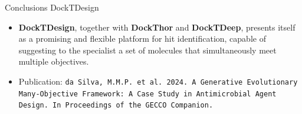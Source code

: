 \documentclass[aspectratio=169,xcolor=dvipsnames]{beamer}
\begin{document}
\begin{frame}{Conclusions \hfill {\footnotesize \alert{DockTDesign}}}

    \begin{itemize}




        \item \textbf{DockTDesign}, together with \textbf{DockThor} and \textbf{DockTDeep}, presents itself as a promising and flexible platform for hit identification, capable of suggesting to the specialist a set of molecules that simultaneously meet multiple objectives.
        \item Publication: \texttt{da Silva, M.M.P. et al. 2024. A Generative Evolutionary Many-Objective Framework: A Case Study in Antimicrobial Agent Design. In Proceedings of the GECCO Companion.}
    \end{itemize}

\end{frame}


\end{document}
